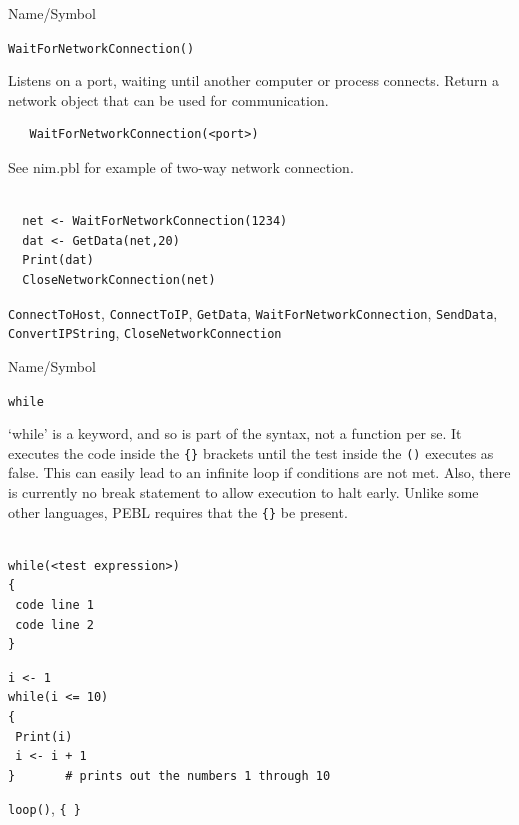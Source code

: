\begin{desc}{Name/Symbol}
\item[Name/Symbol]	\verb+WaitForNetworkConnection()+

\item[Description]	Listens on a port, waiting until another computer or process
  connects. Return a network object that can be used for communication.

\item[Usage]
\begin{verbatim}
   WaitForNetworkConnection(<port>)
\end{verbatim}

\item[Example]	

  See nim.pbl for example of two-way network connection.
\begin{verbatim}

  net <- WaitForNetworkConnection(1234)
  dat <- GetData(net,20)
  Print(dat)
  CloseNetworkConnection(net)
\end{verbatim}

\item[See Also]
  \verb+ConnectToHost+, \verb+ConnectToIP+, \verb+GetData+, \verb+WaitForNetworkConnection+,
   \verb+SendData+, \verb+ConvertIPString+, \verb+CloseNetworkConnection+
\end{desc}




\begin{desc}{Name/Symbol}
\item[Name/Symbol]	\verb+while+

\item[Description] `while' is a keyword, and so is part of the syntax,
  not a function per se.  It executes the code inside the \verb+{}+
  brackets until the test inside the \verb+()+ executes as false.
  This can easily lead to an infinite loop if conditions are not met.
  Also, there is currently no break statement to allow execution to
  halt early.  Unlike some other languages, PEBL requires that the
  \verb+{}+ be present.

\item[Usage]
\begin{verbatim}

while(<test expression>)
{
 code line 1
 code line 2
}
\end{verbatim}

\item[Example] 
\begin{verbatim}
i <- 1
while(i <= 10)
{
 Print(i)
 i <- i + 1
}		# prints out the numbers 1 through 10
\end{verbatim}

\item[See Also] 	\verb+loop()+, \verb+{ }+


\end{desc}




